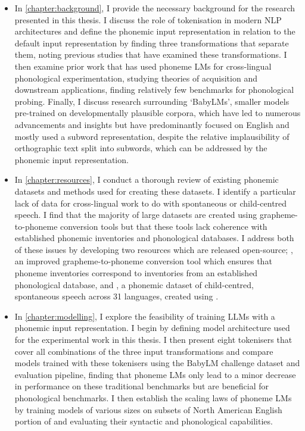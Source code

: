 \begin{itemize}
    \item In \cref{chapter:background}, I provide the necessary background for the research presented in this thesis. I discuss the role of tokenisation in modern NLP architectures and define the phonemic input representation in relation to the default input representation by finding three transformations that separate them, noting previous studies that have examined these transformations. I then examine prior work that has used phoneme LMs for cross-lingual phonological experimentation, studying theories of acquisition and downstream applications, finding relatively few benchmarks for phonological probing. Finally, I discuss research surrounding `BabyLMs', smaller models pre-trained on developmentally plausible corpora, which have led to numerous advancements and insights but have predominantly focused on English and mostly used a subword representation, despite the relative implausibility of orthographic text split into subwords, which can be addressed by the phonemic input representation.
    \item In \cref{chapter:resources}, I conduct a thorough review of existing phonemic datasets and methods used for creating these datasets. I identify a particular lack of data for cross-lingual work to do with spontaneous or child-centred speech. I find that the majority of large datasets are created using grapheme-to-phoneme conversion tools but that these tools lack coherence with established phonemic inventories and phonological databases. I address both of these issues by developing two resources which are released open-source; \gpp, an improved grapheme-to-phoneme conversion tool which ensures that phoneme inventories correspond to inventories from an established phonological database, and \ipachildes, a phonemic dataset of child-centred, spontaneous speech across 31 languages, created using \gpp.
    \item In \cref{chapter:modelling}, I explore the feasibility of training LLMs with a phonemic input representation. I begin by defining model architecture used for the experimental work in this thesis. I then present eight tokenisers that cover all combinations of the three input transformations and compare models trained with these tokenisers using the BabyLM challenge dataset and evaluation pipeline, finding that phoneme LMs only lead to a minor decrease in performance on these traditional benchmarks but are beneficial for phonological benchmarks. I then establish the scaling laws of phoneme LMs by training models of various sizes on subsets of North American English portion of \ipachildes and evaluating their syntactic and phonological capabilities.

\end{itemize}
